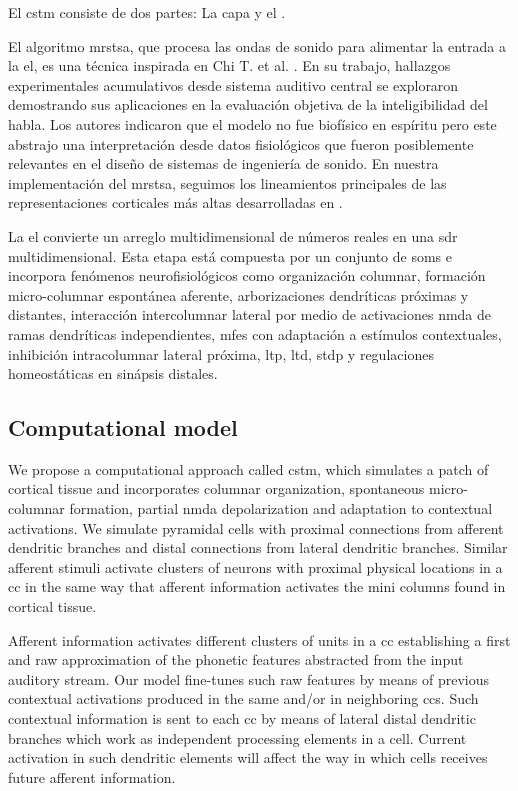 {El \gls{cstm} consiste de dos partes: La capa  y el .

El algoritmo \gls{mrstsa}, que procesa las ondas de sonido para alimentar la entrada a la \gls{el}, es una técnica inspirada en Chi T. et al. \cite{chi_2005}. En su trabajo, hallazgos experimentales acumulativos desde sistema auditivo central se exploraron demostrando sus aplicaciones en la evaluación objetiva de la inteligibilidad del habla. Los autores indicaron que el modelo no fue biofísico en espíritu pero este abstrajo una interpretación desde datos fisiológicos que fueron posiblemente relevantes en el diseño de sistemas de ingeniería de sonido. En nuestra implementación del \gls{mrstsa}, seguimos los lineamientos principales de las representaciones corticales más altas desarrolladas en \cite{chi_2005}.

La \gls{el} convierte un arreglo multidimensional de números reales en una \gls{sdr} multidimensional. Esta etapa está compuesta por un conjunto de \glspl{som} \cite{kohonen_2082, Kohonen:1989:SAM:69371} e incorpora fenómenos neurofisiológicos como organización columnar, formación micro-columnar espontánea aferente, arborizaciones dendríticas próximas y distantes, interacción intercolumnar lateral por medio de activaciones \gls{nmda} de ramas dendríticas independientes, \glspl{mfe} con adaptación a estímulos contextuales, inhibición intracolumnar lateral próxima, \gls{ltp}, \gls{ltd}, \gls{stdp} y regulaciones homeostáticas en sinápsis distales.
}{
\subsection{Computational model}

We propose a computational approach called \gls{cstm}, which simulates a patch of cortical tissue and incorporates columnar organization, spontaneous micro-columnar formation, partial \gls{nmda} depolarization and adaptation to contextual activations. We simulate pyramidal cells with proximal connections from afferent dendritic branches and distal connections from lateral dendritic branches. Similar afferent stimuli activate clusters of neurons with proximal physical locations in a \gls{cc} in the same way that afferent information activates the mini columns found in cortical tissue.

Afferent information activates different clusters of units in a \gls{cc} establishing a first and raw approximation of the phonetic features abstracted from the input auditory stream. Our model fine-tunes such raw features by means of previous contextual activations produced in the same and/or in neighboring \glspl{cc}. Such contextual information is sent to each \gls{cc} by means of lateral distal dendritic branches which work as independent processing elements in a cell. Current activation in such dendritic elements will affect the way in which cells receives future afferent information.

}
